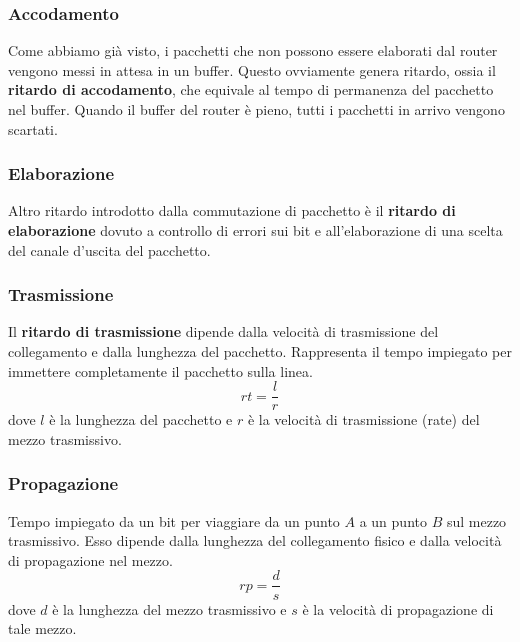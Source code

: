 \subsubsection{Accodamento}
Come abbiamo già visto, i pacchetti che non possono essere elaborati 
dal router vengono messi in attesa in un buffer. Questo ovviamente 
genera ritardo, ossia il \textbf{ritardo di accodamento}, che equivale 
al tempo di permanenza del pacchetto nel buffer. Quando il buffer del 
router è pieno, tutti i pacchetti in arrivo vengono scartati.

\subsubsection{Elaborazione}
Altro ritardo introdotto dalla commutazione di pacchetto è il 
\textbf{ritardo di elaborazione} dovuto a controllo di errori sui bit 
e all'elaborazione di una scelta del canale d'uscita del pacchetto.

\subsubsection{Trasmissione}
Il \textbf{ritardo di trasmissione} dipende dalla velocità di 
trasmissione del collegamento e dalla lunghezza del pacchetto. 
Rappresenta il tempo impiegato per immettere completamente il 
pacchetto sulla linea.
\[ rt = \frac{l}{r} \]
dove $l$ è la lunghezza del pacchetto e $r$ è la velocità di 
trasmissione (rate) del mezzo trasmissivo.

\subsubsection{Propagazione}
Tempo impiegato da un bit per viaggiare da un punto $A$ a un punto $B$
sul mezzo trasmissivo. Esso dipende dalla lunghezza del collegamento 
fisico e dalla velocità di propagazione nel mezzo.
\[ rp = \frac{d}{s} \]
dove $d$ è la lunghezza del mezzo trasmissivo e $s$ è la velocità di 
propagazione di tale mezzo.

